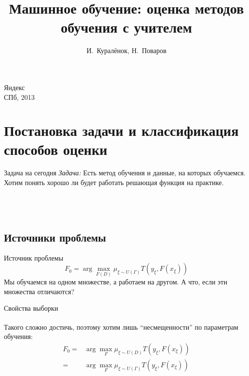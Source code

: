 \documentclass[14pt, fleqn, xcolor={dvipsnames, table}]{beamer}
\title{Машинное обучение: оценка методов обучения с учителем\\\small{}}
\author[]{\small{%
И.~Куралёнок,
Н.~Поваров}}
\date{}
\begin{document}
\begin{frame}
\maketitle
\small
\begin{center}
\vspace{-60pt}
\normalsize {\color{red}Я}ндекс \\
\vspace{80pt}
\footnotesize СПб, 2013
\end{center}
\end{frame}

\section{Постановка задачи и классификация способов оценки}
\begin{frame}{Задача на сегодня}
\emph{Задача:} Есть метод обучения и данные, на которых обучаемся. Хотим понять хорошо ли будет работать решающая функция на практике.\\

 \\
 \\

 \\
\end{frame}

\subsection{Источники проблемы}
\begin{frame}{Источник проблемы}
$$
F_0 = \arg \max_{F(D)} \mu_{\xi \sim U\left(\Gamma\right)}T(y_{\xi}, F(x_{\xi}))
$$
Мы обучаемся на одном множестве, а работаем на другом. А что, если эти множества отличаются?
\end{frame}

\begin{frame}{Свойства выборки}
\\
\\
\flushleft
Такого сложно достичь, поэтому хотим лишь ``несмещенности'' по параметрам обучения:
\small
$$\begin{array}{rl}
F_0 =& \arg \max_{F} \mu_{\xi \sim U(D)} T(y_{\xi}, F(x_{\xi})) \\
    =& \arg \max_{F} \mu_{\xi \sim U(\Gamma)} T(y_{\xi}, F(x_{\xi}))
\end{array}$$
\end{frame}
\end{document}
